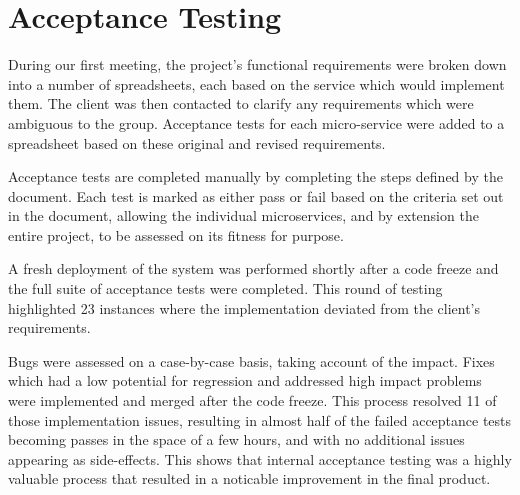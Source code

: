 \section{Acceptance Testing}
\par
During our first meeting, the project's functional requirements were broken down into a number of spreadsheets, each based on the service which would implement them. The client was then contacted to clarify any requirements which were ambiguous to the group. Acceptance tests for each micro-service were added to a spreadsheet based on these original and revised requirements.

\par
Acceptance tests are completed manually by completing the steps defined by the document. Each test is marked as either pass or fail based on the criteria set out in the document, allowing the individual microservices, and by extension the entire project, to be assessed on its fitness for purpose.

\par
A fresh deployment of the system was performed shortly after a code freeze and the full suite of acceptance tests were completed. This round of testing highlighted 23 instances where the implementation deviated from the client's requirements.

\par
Bugs were assessed on a case-by-case basis, taking account of the impact. Fixes which had a low potential for regression and addressed high impact problems were implemented and merged after the code freeze. This process resolved 11 of those implementation issues, resulting in almost half of the failed acceptance tests becoming passes in the space of a few hours, and with no additional issues appearing as side-effects. This shows that internal acceptance testing was a highly valuable process that resulted in a noticable improvement in the final product.
